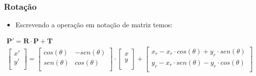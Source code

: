 \documentclass{beamer}
\begin{document}

\begin{frame}
\frametitle{Rotação}
		\begin{itemize}
			\item Escrevendo a operação em notação de matriz temos:
		\end{itemize}
		\begin{eqnarray*}
			\textbf{P}' = \textbf{R} \cdot \textbf{P} + \textbf{T} \\
			\begin{bmatrix} 
								x' \\
								y' \\
							\end{bmatrix}
			=
			 \begin{bmatrix}
								cos(\theta) & -sen(\theta) \\
								sen(\theta) & cos(\theta)\\
							\end{bmatrix}
			\cdot \begin{bmatrix}
								x \\
								y \\
							\end{bmatrix}
		 	+ \begin{bmatrix}
		 		x_r-x_r \cdot cos(\theta)+y_r \cdot sen(\theta) \\
				y_r-x_r \cdot sen(\theta)-y_r \cdot cos(\theta) \\		 	
		 	\end{bmatrix}
		\end{eqnarray*}
	
\end{frame}

\end{document}
